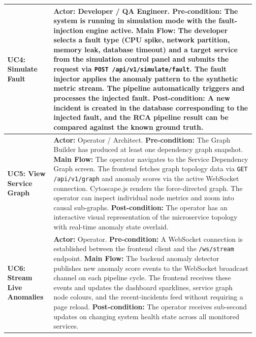 \begin{center}
\begin{longtable}{|p{4cm}|p{9.8cm}|}
\textbf{UC4: Simulate Fault} &
\textbf{Actor:} Developer / QA Engineer. \newline
\textbf{Pre-condition:} The system is running in simulation mode with the fault-injection engine active. \newline
\textbf{Main Flow:} The developer selects a fault type (CPU spike, network partition, memory leak, database timeout) and a target service from the simulation control panel and submits the request via \texttt{POST /api/v1/simulate/fault}. The fault injector applies the anomaly pattern to the synthetic metric stream. The pipeline automatically triggers and processes the injected fault. \newline
\textbf{Post-condition:} A new incident is created in the database corresponding to the injected fault, and the RCA pipeline result can be compared against the known ground truth. \\
\hline

\textbf{UC5: View Service Graph} &
\textbf{Actor:} Operator / Architect. \newline
\textbf{Pre-condition:} The Graph Builder has produced at least one dependency graph snapshot. \newline
\textbf{Main Flow:} The operator navigates to the Service Dependency Graph screen. The frontend fetches graph topology data via \texttt{GET /api/v1/graph} and anomaly scores via the active WebSocket connection. Cytoscape.js renders the force-directed graph. The operator can inspect individual node metrics and zoom into causal sub-graphs. \newline
\textbf{Post-condition:} The operator has an interactive visual representation of the microservice topology with real-time anomaly state overlaid. \\
\hline

\textbf{UC6: Stream Live Anomalies} &
\textbf{Actor:} Operator. \newline
\textbf{Pre-condition:} A WebSocket connection is established between the frontend client and the \texttt{/ws/stream} endpoint. \newline
\textbf{Main Flow:} The backend anomaly detector publishes new anomaly score events to the WebSocket broadcast channel on each pipeline cycle. The frontend receives these events and updates the dashboard sparklines, service graph node colours, and the recent-incidents feed without requiring a page reload. \newline
\textbf{Post-condition:} The operator receives sub-second updates on changing system health state across all monitored services. \\
\hline


\end{longtable}
\end{center}
